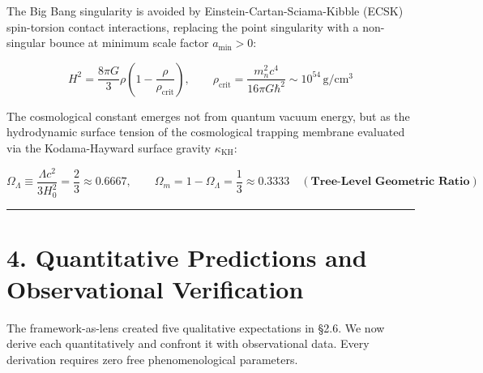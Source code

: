 \documentclass[11pt,a4paper]{article}
\theoremstyle{definition}\newtheorem{definition}{Definition}
\theoremstyle{remark}\newtheorem{remark}{Remark}
\begin{document}
The Big Bang singularity is avoided by Einstein-Cartan-Sciama-Kibble (ECSK) spin-torsion contact interactions, replacing the point singularity with a non-singular bounce at minimum scale factor $a_{\text{min}} > 0$:


\begin{equation}
\boxed{H^2 = \frac{8\pi G}{3}\rho \left( 1 - \frac{\rho}{\rho_{\text{crit}}} \right), \qquad \rho_{\text{crit}} = \frac{m_n^2 c^4}{16\pi G \hbar^2} \sim 10^{54} \, \mathrm{g/cm^3}}
\end{equation}


The cosmological constant emerges not from quantum vacuum energy, but as the hydrodynamic surface tension of the cosmological trapping membrane evaluated via the Kodama-Hayward surface gravity $\kappa_{\text{KH}}$:


\begin{equation}
\boxed{\Omega_\Lambda \equiv \frac{\Lambda c^2}{3 H_0^2} = \frac{2}{3} \approx 0.6667, \qquad \Omega_m = 1 - \Omega_\Lambda = \frac{1}{3} \approx 0.3333 \quad (\textbf{Tree-Level Geometric Ratio})}
\end{equation}


\noindent\rule{\linewidth}{0.4pt}
\section{4. Quantitative Predictions and Observational Verification}

The framework-as-lens created five qualitative expectations in §2.6. We now derive each quantitatively and confront it with observational data. Every derivation requires zero free phenomenological parameters.
\end{document}
